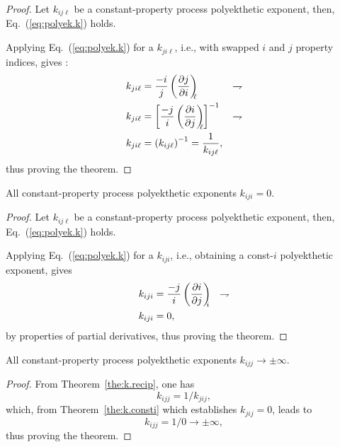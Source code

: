     \begin{proof}
        Let  $k_{ij\ell}$  be  a  constant-property   process   polyekthetic   exponent,   then,
        Eq.~(\ref{eq:polyek.k}) holds.

        Applying Eq.~(\ref{eq:polyek.k}) for a $k_{ji\ell}$, i.e.,  with  swapped  $i$  and  $j$
        property indices, gives :
        \begin{align}
            k_{ji\ell} &= \frac{-i}{j} \left(\frac{\partial {{j}}}{\partial {{i}}}\right)_{\!\!\!{\ell}}
                       & \rightharpoondown\\
            k_{ji\ell} &= \left[\frac{-j}{i} \left(\frac{\partial {{i}}}{\partial {{j}}}\right)_{\!\!\!{\ell}}\right]^{-1}
                       & \rightharpoondown\\
            k_{ji\ell} &= \left(k_{ij\ell}\right)^{-1} = \frac{1}{k_{ij\ell}},
        \end{align}
        \noindent thus proving the theorem.
    \end{proof}

    \begin{theorem}\label{the:k.consti}
        All constant-property process polyekthetic exponents $k_{iji} = 0$.
    \end{theorem}

    \begin{proof}
        Let  $k_{ij\ell}$  be  a  constant-property   process   polyekthetic   exponent,   then,
        Eq.~(\ref{eq:polyek.k}) holds.

        Applying  Eq.~(\ref{eq:polyek.k})  for  a  $k_{iji}$,  i.e.,   obtaining   a   const-$i$
        polyekthetic exponent, gives
        \begin{align}
            k_{iji} &= \frac{-j}{i} \left(\frac{\partial {{i}}}{\partial {{j}}}\right)_{\!\!\!{i}}
                    & \rightharpoondown\\
            k_{iji} &= 0,
        \end{align}
        \noindent by properties of partial derivatives, thus proving the theorem.
    \end{proof}

    \begin{theorem}\label{the:k.constj}
        All constant-property process polyekthetic exponents $k_{ijj} \to \pm\infty$.
    \end{theorem}

    \begin{proof}
        From Theorem~\ref{the:k.recip}, one has
        \begin{equation}
            k_{ijj} = 1 / k_{jij},
        \end{equation}
        \noindent which, from Theorem~\ref{the:k.consti} which establishes $k_{jij} = 0$,  leads
        to
        \begin{equation}
            k_{ijj} = 1 / 0 \to \pm\infty,
        \end{equation}
        \noindent thus proving the theorem.
    \end{proof}

